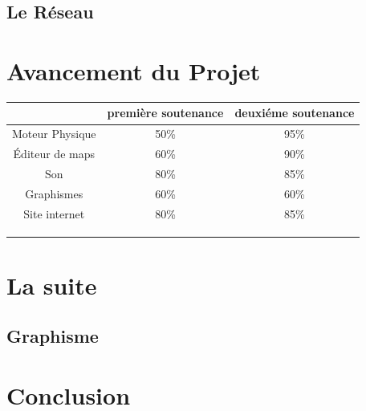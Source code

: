 \documentclass [11pt]{report}
\begin{document}
	\section{Le R\'eseau}
\chapter{Avancement du Projet}
	\begin{tabular}{|c|c|c|}
	\hline  & premi\`ere soutenance & deuxi\'eme soutenance \\ 
	\hline Moteur Physique & 50\% & 95\% \\ 
	\hline \'Editeur de maps & 60\% & 90\% \\ 
	\hline Son & 80\% & 85\% \\ 
	\hline Graphismes & 60\% & 60\% \\ 
	\hline Site internet & 80\% & 85\% \\ 
	\hline  &  &  \\ 
	\hline  &  &  \\ 
	\hline  &  &  \\ 
	\hline 
	\end{tabular} 
\chapter{La suite}
	\section{Graphisme}
\chapter*{Conclusion}
\end{document}

